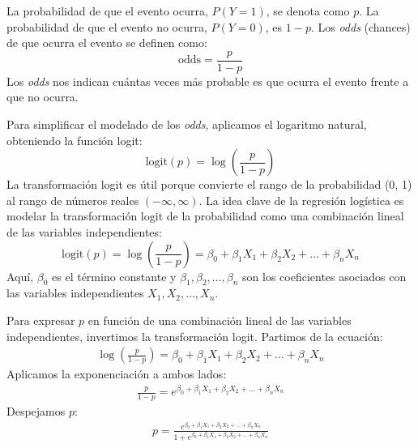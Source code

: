 La probabilidad de que el evento ocurra, $P(Y=1)$, se denota como $p$. La probabilidad de que el evento no ocurra, $P(Y=0)$, es $1-p$. Los \textit{odds} (chances) de que ocurra el evento se definen como:
\begin{equation}
\text{odds} = \frac{p}{1-p}
\end{equation}
Los \textit{odds} nos indican cuántas veces más probable es que ocurra el evento frente a que no ocurra.


Para simplificar el modelado de los \textit{odds}, aplicamos el logaritmo natural, obteniendo la función logit:
\begin{equation}
\text{logit}(p) = \log\left(\frac{p}{1-p}\right)
\end{equation}
La transformación logit es útil porque convierte el rango de la probabilidad (0, 1) al rango de números reales $\left(-\infty, \infty\right)$. La idea clave de la regresión logística es modelar la transformación logit de la probabilidad como una combinación lineal de las variables independientes:
\begin{equation}
\text{logit}(p) = \log\left(\frac{p}{1-p}\right) = \beta_0 + \beta_1 X_1 + \beta_2 X_2 + \ldots + \beta_n X_n
\end{equation}
Aquí, $\beta_0$ es el t\'ermino constante y $\beta_1, \beta_2, \ldots, \beta_n$ son los coeficientes asociados con las variables independientes $X_1, X_2, \ldots, X_n$.


Para expresar $p$ en función de una combinación lineal de las variables independientes, invertimos la transformación logit. Partimos de la ecuación:
\begin{eqnarray*}
\log\left(\frac{p}{1-p}\right) = \beta_0 + \beta_1 X_1 + \beta_2 X_2 + \ldots + \beta_n X_n
\end{eqnarray*}
Aplicamos la exponenciación a ambos lados:
\begin{eqnarray*}
\frac{p}{1-p} = e^{\beta_0 + \beta_1 X_1 + \beta_2 X_2 + \ldots + \beta_n X_n}
\end{eqnarray*}
Despejamos $p$:
\begin{eqnarray*}
p = \frac{e^{\beta_0 + \beta_1 X_1 + \beta_2 X_2 + \ldots + \beta_n X_n}}{1 + e^{\beta_0 + \beta_1 X_1 + \beta_2 X_2 + \ldots + \beta_n X_n}}
\end{eqnarray*}

